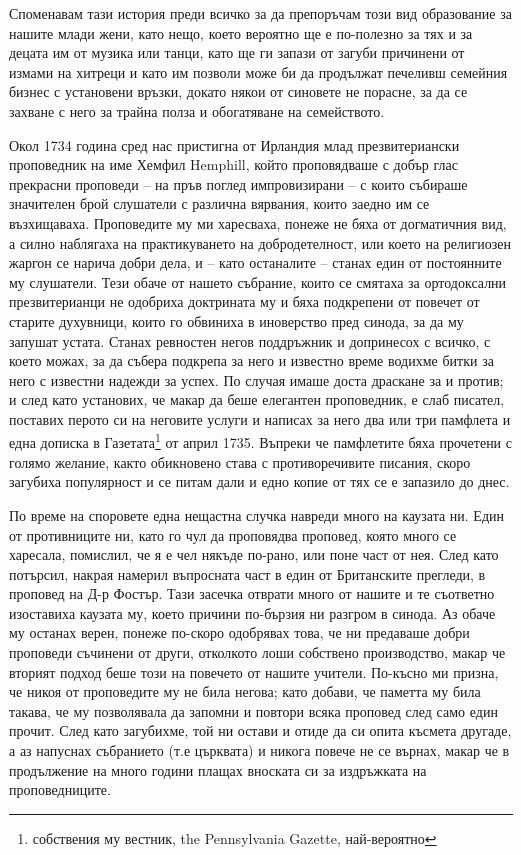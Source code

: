 \documentclass[12pt]{book}
\begin{document}
Споменавам тази история преди всичко за да препоръчам този вид образование за нашите млади жени, като нещо, което вероятно ще е по-полезно за тях и за децата им от музика или танци, като ще ги запази от загуби причинени от измами на хитреци и като им позволи може би да продължат печеливш семейния бизнес с установени връзки, докато някои от синовете не порасне, за да се захване с него за трайна полза и обогатяване на семейството.

Окол 1734 година сред нас пристигна от Ирландия млад презвитериански проповедник на име Хемфил Hemphill, който проповядваше с добър глас прекрасни проповеди – на пръв поглед импровизирани – с които събираше значителен брой слушатели с различна вярвания, които заедно им се възхищаваха. Проповедите му ми харесваха, понеже не бяха от догматичния вид, а силно наблягаха на практикуването на добродетелност, или което на религиозен жаргон се нарича добри дела, и – като останалите – станах един от постоянните му слушатели. Тези обаче от нашето събрание, които се смятаха за ортодоксални презвитерианци не одобриха доктрината му и бяха подкрепени от повечет от старите духувници, които го обвиниха в иноверство пред синода, за да му запушат устата. Станах ревностен негов поддръжник и допринесох с всичко, с което можах, за да събера подкрепа за него и известно време водихме битки за него с известни надежди за успех. По случая имаше доста драскане за и против; и след като установих, че макар да беше елегантен проповедник, е слаб писател, поставих перото си на неговите услуги и написах за него два или три памфлета и една дописка в Газетата\footnote{собствения му вестник, the Pennsylvania Gazette, най-вероятно} от април 1735. Въпреки че памфлетите бяха прочетени с голямо желание, както обикновено става с противоречивите писания, скоро загубиха популярност и се питам дали и едно копие от тях се е запазило до днес.

По време на споровете една нещастна случка навреди много на каузата ни. Един от противниците ни, като го чул да проповядва проповед, която много се харесала, помислил, че я е чел някъде по-рано, или поне част от нея. След като потърсил, накрая намерил въпросната част в един от Британските прегледи, в проповед на Д-р Фостър. Тази засечка отврати много от нашите и те съответно изоставиха каузата му, което причини по-бързия ни разгром в синода. Аз обаче му останах верен, понеже по-скоро одобрявах това, че ни предаваше добри проповеди съчинени от други, отколкото лоши собствено производство, макар че вторият подход беше този на повечето от нашите учители. По-късно ми призна, че никоя от проповедите му не била негова; като добави, че паметта му била такава, че му позволявала да запомни и повтори всяка проповед след само един прочит. След като загубихме, той ни остави и отиде да си опита късмета другаде, а аз напуснах събранието (т.е църквата) и никога повече не се върнах, макар че в продължение на много години плащах вноската си за издръжката на проповедниците.
\end{document}
